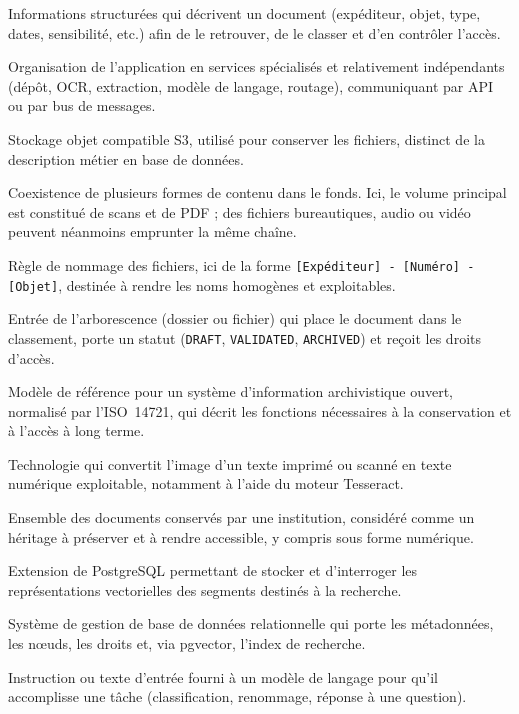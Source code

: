 \documentclass[12pt,a4paper]{report}
\begin{document}
\begin{description}[style=unboxed, leftmargin=0pt, itemsep=0.55em, parsep=0.12em, font=\normalfont\bfseries]
  \item[métadonnées] Informations structurées qui décrivent un document (expéditeur, objet, type, dates, sensibilité, etc.) afin de le retrouver, de le classer et d'en contrôler l'accès.
  \item[microservices] Organisation de l'application en services spécialisés et relativement indépendants (dépôt, OCR, extraction, modèle de langage, routage), communiquant par API ou par bus de messages.
  \item[MinIO] Stockage objet compatible S3, utilisé pour conserver les fichiers, distinct de la description métier en base de données.
  \item[multimodalité] Coexistence de plusieurs formes de contenu dans le fonds. Ici, le volume principal est constitué de scans et de PDF ; des fichiers bureautiques, audio ou vidéo peuvent néanmoins emprunter la même chaîne.
  \item[nomenclature] Règle de nommage des fichiers, ici de la forme \texttt{[Expéditeur] - [Numéro] - [Objet]}, destinée à rendre les noms homogènes et exploitables.
  \item[nœud d'exploration] Entrée de l'arborescence (dossier ou fichier) qui place le document dans le classement, porte un statut (\texttt{DRAFT}, \texttt{VALIDATED}, \texttt{ARCHIVED}) et reçoit les droits d'accès.
  \item[OAIS (\textit{Open Archival Information System})] Modèle de référence pour un système d'information archivistique ouvert, normalisé par l'\mbox{ISO 14721}, qui décrit les fonctions nécessaires à la conservation et à l'accès à long terme.
  \item[OCR (\textit{Optical Character Recognition})] Technologie qui convertit l'image d'un texte imprimé ou scanné en texte numérique exploitable, notamment à l'aide du moteur Tesseract.
  \item[patrimoine documentaire] Ensemble des documents conservés par une institution, considéré comme un héritage à préserver et à rendre accessible, y compris sous forme numérique.
  \item[pgvector] Extension de PostgreSQL permettant de stocker et d'interroger les représentations vectorielles des segments destinés à la recherche.
  \item[PostgreSQL] Système de gestion de base de données relationnelle qui porte les métadonnées, les nœuds, les droits et, via pgvector, l'index de recherche.
  \item[prompt] Instruction ou texte d'entrée fourni à un modèle de langage pour qu'il accomplisse une tâche (classification, renommage, réponse à une question).

\end{description}
\end{document}
